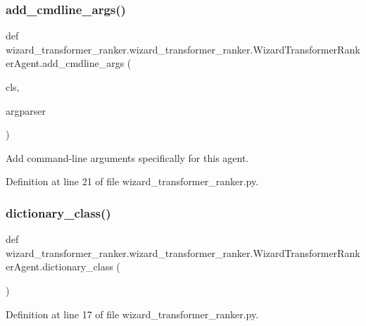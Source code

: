 \subsubsection{\texorpdfstring{add\+\_\+cmdline\+\_\+args()}{add\_cmdline\_args()}}
{\footnotesize\ttfamily def wizard\+\_\+transformer\+\_\+ranker.\+wizard\+\_\+transformer\+\_\+ranker.\+Wizard\+Transformer\+Ranker\+Agent.\+add\+\_\+cmdline\+\_\+args (\begin{DoxyParamCaption}\item[{}]{cls,  }\item[{}]{argparser }\end{DoxyParamCaption})}

\begin{DoxyVerb}Add command-line arguments specifically for this agent.\end{DoxyVerb}
 

Definition at line 21 of file wizard\+\_\+transformer\+\_\+ranker.\+py.

\mbox{\label{classwizard__transformer__ranker_1_1wizard__transformer__ranker_1_1WizardTransformerRankerAgent_ab871cd99b32921aa5aa96306ad0818a6}} 
\subsubsection{\texorpdfstring{dictionary\+\_\+class()}{dictionary\_class()}}
{\footnotesize\ttfamily def wizard\+\_\+transformer\+\_\+ranker.\+wizard\+\_\+transformer\+\_\+ranker.\+Wizard\+Transformer\+Ranker\+Agent.\+dictionary\+\_\+class (\begin{DoxyParamCaption}{ }\end{DoxyParamCaption})\hspace{0.3cm}{\ttfamily [static]}}



Definition at line 17 of file wizard\+\_\+transformer\+\_\+ranker.\+py.

